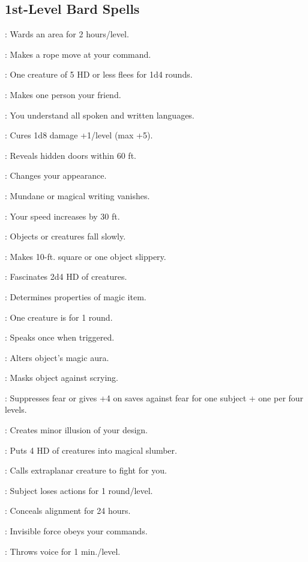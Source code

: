 \begin{multicols}{2}
\subsection{1st-Level Bard Spells}
\begin{description*}
\item[\linkspell{Alarm}:] Wards an area for 2 hours/level.
\item[\linkspell{Animate Rope}:] Makes a rope move at your command.
\item[\linkspell{Cause Fear}:] One creature of 5 HD or less flees for 1d4 rounds.
\item[\linkspell{Charm Person}:] Makes one person your friend.
\item[\linkspell{Comprehend Languages}:] You understand all spoken and written languages.
\item[\linkspell{Cure Light Wounds}:] Cures 1d8 damage +1/level (max +5).
\item[\linkspell{Detect Secret Doors}:] Reveals hidden doors within 60 ft.
\item[\linkspell{Disguise Self}:] Changes your appearance.
\item[\linkspell{Erase}:] Mundane or magical writing vanishes.
\item[\linkspell{Expeditious Retreat}:] Your speed increases by 30 ft.
\item[\linkspell{Feather Fall}:] Objects or creatures fall slowly.
\item[\linkspell{Grease}:] Makes 10-ft. square or one object slippery.
\item[\linkspell{Hypnotism}:] Fascinates 2d4 HD of creatures.
\item[\linkspell{Identify}:] Determines properties of magic item.
\item[\linkspell{Lesser Confusion}:] One creature is  for 1 round.
\item[\linkspell{Magic Mouth}:] Speaks once when triggered.
\item[\linkspell{Nystul’s Magic Aura}:] Alters object’s magic aura.
\item[\linkspell{Obscure Object}:] Masks object against scrying.
\item[\linkspell{Remove Fear}:] Suppresses fear or gives +4 on saves against fear for one subject + one per four levels.
\item[\linkspell{Silent Image}:] Creates minor illusion of your design.
\item[\linkspell{Sleep}:] Puts 4 HD of creatures into magical slumber.
\item[\linkspell{Summon Monster I}:] Calls extraplanar creature to fight for you.
\item[\linkspell{Hideous Laughter}:] Subject loses actions for 1 round/level.
\item[\linkspell{Undetectable Alignment}:] Conceals alignment for 24 hours.
\item[\linkspell{Unseen Servant}:] Invisible force obeys your commands.
\item[\linkspell{Ventriloquism}:] Throws voice for 1 min./level.
\end{description*}


\end{multicols}
